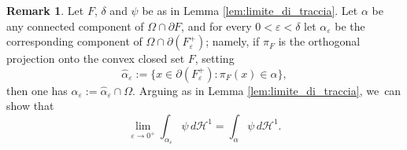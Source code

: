 \documentclass[JEP,XML,SOM,Unicode, NoFloatCountersInSection,published]{cedram}
\let\eps\varepsilon
\let\Om\Omega
\theoremstyle{definition}
\newtheorem{remark}[theorem]{Remark}
\begin{document}
\begin{remark} \label{rem:limite_di_traccia} Let $F$, $\delta$ and $\psi$ be as in Lemma \ref{lem:limite_di_traccia}.
Let $\alpha$ be any connected component of $\Om\cap\partial F$, and for every $0<\eps<\delta$ let $\alpha_\eps$ be the corresponding component of $\Om\cap\partial (F^+_\eps)$; namely, if $\pi_F$ is the orthogonal projection onto the convex closed set $F$, setting
\[
\widehat\alpha_\eps:=\{x\in \partial (F^+_\eps):\pi_F(x)\in \alpha\},
\]
then one has $\alpha_\eps:=\widehat\alpha_\eps\cap \Om$.
Arguing as in Lemma \ref{lem:limite_di_traccia}, we~can show that
\begin{equation*}
\lim_{\eps\to0^+}
\int_{\alpha_\eps}\psi\,d\mathcal{H}^1=\int_{\alpha}\psi\,d\mathcal{H}^1.
\end{equation*}
\end{remark}
\end{document}
